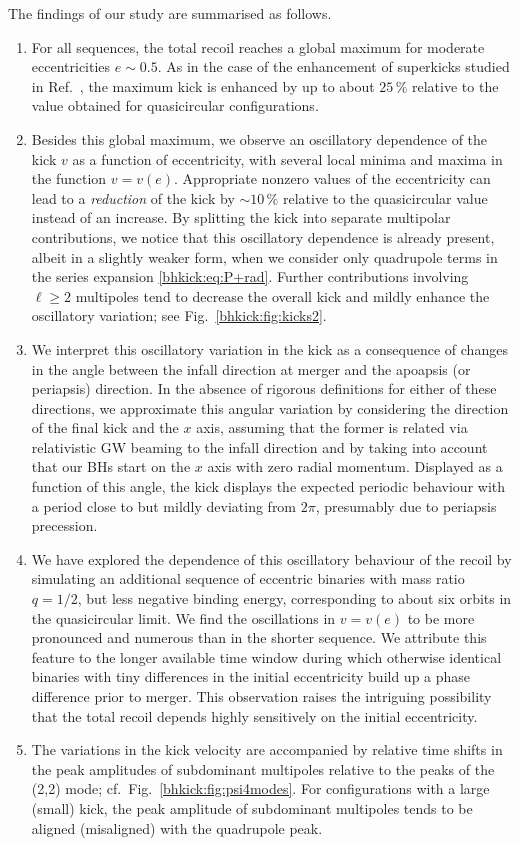 The findings of our study are summarised as follows.
%
\begin{enumerate}
 \item For all sequences, the total recoil reaches
 a global maximum for moderate eccentricities $e \sim 0.5$.
 As in the case of the enhancement of superkicks studied
 in Ref.~\cite{Sperhake:2019wwo}, the maximum kick is
 enhanced by up to about $25\,\%$ relative to the value obtained
 for quasicircular configurations.
\item Besides this global maximum, we observe an oscillatory
  dependence of the kick $v$ as a function of eccentricity, with
  several local minima and maxima in the function $v = v(e)$. Appropriate
  nonzero values of the eccentricity can lead to a
  {\it reduction} of the kick by $\sim 10\,\%$ relative to the quasicircular
  value instead of an increase. By
  splitting the kick into separate multipolar contributions, we notice
  that this oscillatory dependence is already present, albeit in a
  slightly weaker form, when we consider only quadrupole terms in the
  series expansion \eqref{bhkick:eq:P+rad}.  Further contributions involving
  $\ell \ge 2$ multipoles tend to decrease the overall kick and mildly
  enhance the oscillatory variation; see Fig.~\ref{bhkick:fig:kicks2}.
 \item We interpret this oscillatory variation in the kick
 as a consequence of changes in the angle between the infall
 direction at merger and the apoapsis (or periapsis)
 direction. In the absence of rigorous definitions for either
 of these directions, we approximate this angular variation
 by considering the direction of the final kick and the
 $x$ axis, assuming that the former is related via relativistic
 GW beaming to the infall direction and by taking into account
 that our BHs start on the $x$ axis with zero radial momentum.
 Displayed as a function of this angle, the kick displays
 the expected periodic behaviour with a period close to but
 mildly deviating from $2\pi$, presumably due to periapsis
 precession.
 \item We have explored the dependence of this oscillatory behaviour
 of the recoil by simulating an additional sequence of eccentric
 binaries with mass ratio $q=1/2$, but less negative binding energy,
 corresponding to about six orbits in the quasicircular limit.
 We find the oscillations in $v=v(e)$ to be more pronounced
 and numerous than in the shorter sequence. We attribute this
 feature to the longer available time window during which otherwise
 identical binaries with tiny differences in the initial
 eccentricity build up a phase difference prior to merger.
 This observation raises the intriguing possibility that the
 total recoil depends highly sensitively on the initial eccentricity.
 \item The variations in the kick velocity are accompanied by
 relative time shifts in the peak amplitudes of subdominant
 multipoles relative to the peaks of the (2,2) mode;
 cf.~Fig.~\ref{bhkick:fig:psi4modes}. For configurations with a large (small)
 kick, the peak amplitude of subdominant multipoles tends to
 be aligned (misaligned) with the quadrupole peak.
\end{enumerate}

